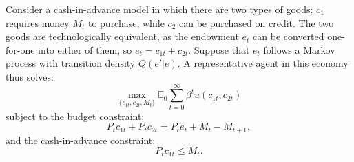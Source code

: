 \documentclass{article}
\newcommand{\E}{\mathbb{E}}
\begin{document}
Consider a cash-in-advance model in which there are two types of
goods: $c_1$ requires money $M_t$ to purchase, while $c_2$ can be
purchased on credit. The two goods are technologically equivalent, as
the endowment $e_t$ can be converted one-for-one into either of them,
so $e_t = c_{1t}+c_{2t}$. Suppose that $e_t$ follows a Markov process
with transition density $Q(e'|e)$. A representative agent in this
economy thus solves:
\begin{equation*}
  \max_{\{c_{1t},c_{2t},M_t\}} \E_0\sum_{t=0}^\infty\beta^tu(c_{1t},c_{2t})
\end{equation*}
subject to the budget constraint:
\begin{equation*}
  P_tc_{1t}+P_tc_{2t}=P_te_t+M_t-M_{t+1},
\end{equation*}
and the cash-in-advance constraint:
\begin{equation*}
  P_tc_{1t}\le M_t.
\end{equation*}
\end{document}
